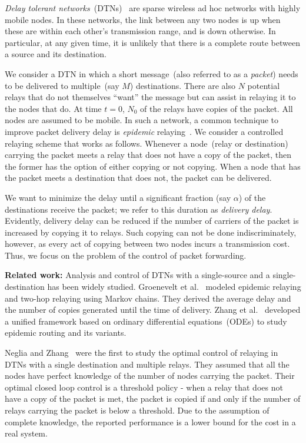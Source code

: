 \documentclass[10pt,journal,letterpaper]{IEEEtran}
\begin{document}
{\it Delay tolerant networks}~(DTNs)~\cite{comnet-dtn.fall03dtn-architecture}
 are sparse wireless ad hoc networks with highly mobile nodes.
In these networks, the link between any two nodes is up when these are
within each other's transmission range, and is down otherwise. In
particular, at any given time, it is unlikely that there is a complete route between a source and its
destination.


We consider a DTN in which a short message~(also referred to as a
{\it packet}) needs to be delivered to multiple~(say $M$)
destinations. There are also $N$ potential relays that do not
themselves ``want'' the message but can assist in relaying it to the
nodes that do. At time $t=0$, $N_0$ of the relays have copies of the
packet. All nodes are assumed to be mobile. In such a network, a
common technique to improve packet delivery delay is {\it epidemic}
relaying~\cite{comnet-dtn.vahdat-becker00epidemic-routing}. We
consider a controlled relaying scheme that works as follows.
Whenever a node~(relay or destination) carrying the packet meets a
relay that does not have a copy of the packet, then the former has
the option of either copying or not copying. When a node that has
the packet meets a destination that does not, the packet can be
delivered.


We want to minimize the delay until a significant fraction (say $\alpha$) of the destinations receive the packet;
we refer to this duration as {\it delivery delay}.
Evidently, delivery delay can be reduced if the number of carriers of
the packet is increased by copying it to relays. Such copying can not be
done indiscriminately, however, as every act of copying between two
nodes incurs a transmission cost. Thus, we focus
on the problem of the control of packet forwarding.

\noindent
{\bf Related work:} Analysis and control of DTNs with a single-source
and a single-destination has been widely studied. Groenevelt et
al.~\cite{comnet-dtn.groenevelt-etal05message-delay-mobile-networks}
modeled epidemic relaying and two-hop relaying using Markov chains.
They derived the average delay and the number of copies generated until
the time of delivery. Zhang et
al.~\cite{comnet-dtn.zhang-etal07epidemic-routing} developed a unified
framework based on ordinary differential equations~(ODEs) to study epidemic
routing and its variants.

Neglia and Zhang~\cite{ctrltheory-dtn.neglia-zhang06optimal-delay-power-tradeoff}
were the first to study the optimal control of relaying in
DTNs with a single destination and multiple relays. They
assumed that all the nodes have perfect knowledge of the number of nodes carrying the packet.
Their optimal closed loop control is a threshold policy - when a relay that does not have a copy
of the packet is met, the packet
is copied if and only if the number of relays carrying the packet is below a threshold.
Due to the assumption of complete knowledge, the reported performance is a lower bound for the cost in a real
system.
\end{document}
